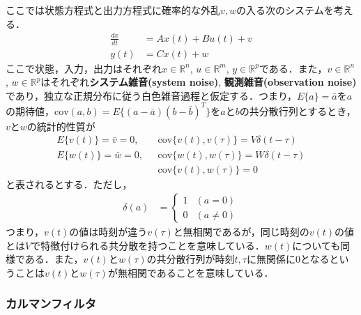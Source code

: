 ここでは状態方程式と出力方程式に確率的な外乱$v,w$の入る次のシステムを考える．
\begin{align}
 \frac{dx}{dt} &= A x(t) + B u(t) +  v \label{state_eq_dis} \\
 y(t) &= C x(t) + w \label{output_eq_dis}
\end{align}
ここで状態，入力，出力はそれぞれ$x \in {\mathbb R}^n$, $ u \in {\mathbb R}^m $, $ y \in {\mathbb
R}^p $である．また，$v \in {\mathbb R}^n$, $w \in {\mathbb R}^p$はそれぞれ{\bf システム雑音(system noise)}, {\bf 観測雑音(observation noise)}であり，独立な正規分布に従う白色雑音過程と仮定する．つまり，$E\{ a \} = \bar{a} $を$a$の期待値，$\mbox{cov}(a,b) = E \{ (a-\bar{a})(b-\bar{b})^T \}$を$a$と$b$の共分散行列とするとき，$v$と$w$の統計的性質が
\begin{align}
     E \{ v(t) \} = \bar{v} = 0, & \ \ \ \mbox{cov}\{ v(t), v(\tau)\} = V \delta(t-\tau)
\\
     E \{ w(t) \} = \bar{w} = 0, & \ \ \ \mbox{cov}\{ w(t), w(\tau)\} = W \delta(t-\tau)
\\
                       & \ \ \ \mbox{cov} \{v(t), w(\tau) \} =0  
\end{align}
と表されるとする．ただし，
\begin{align}
	\delta(a)
	&= \left \{
		\begin{array}{ll}
			1 & (a =    0) \\
			0 & (a \neq 0)
		\end{array}
	   \right .
\end{align}
つまり，$v(t)$の値は時刻が違う$v(\tau)$と無相関であるが，同じ時刻の$v(t)$の値とは$V$で特徴付けられる共分散を持つことを意味している．$w(t)$についても同様である．また，$v(t)$と$w(\tau)$の共分散行列が時刻$t,\tau$に無関係に$0$となるということは$v(t)$と$w(\tau)$が無相関であることを意味している．


\subsubsection{カルマンフィルタ}

